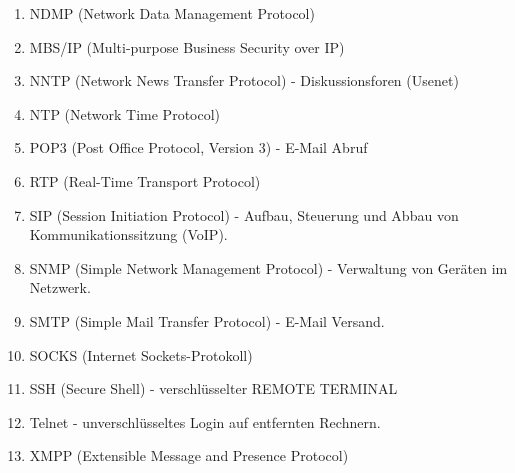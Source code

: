 \documentclass[11pt]{article}
\begin{document}
\begin{enumerate}
\begin{addmargin}[1em]{1em}
\begin{enumerate}
                \item NDMP (Network Data Management Protocol)\\

                \item MBS/IP (Multi-purpose Business Security over IP)\\

                \item NNTP (Network News Transfer Protocol) - Diskussionsforen (Usenet)\\

                \item NTP (Network Time Protocol)\\

                \item POP3 (Post Office Protocol, Version 3) - E-Mail Abruf\\

                \item RTP (Real-Time Transport Protocol)\\

                \item SIP (Session Initiation Protocol) - Aufbau, Steuerung und Abbau von
                Kommunikationssitzung (VoIP).\\

                \item SNMP (Simple Network Management Protocol) - Verwaltung von Geräten im Netzwerk.\\

                \item SMTP (Simple Mail Transfer Protocol) - E-Mail Versand.\\

                \item SOCKS (Internet Sockets-Protokoll)\\

                \item SSH (Secure Shell) - verschlüsselter REMOTE TERMINAL\\

                \item Telnet - unverschlüsseltes Login auf entfernten Rechnern.\\

                \item XMPP (Extensible Message and Presence Protocol)\\


\end{enumerate}
\end{addmargin}
\end{enumerate}
\end{document}
